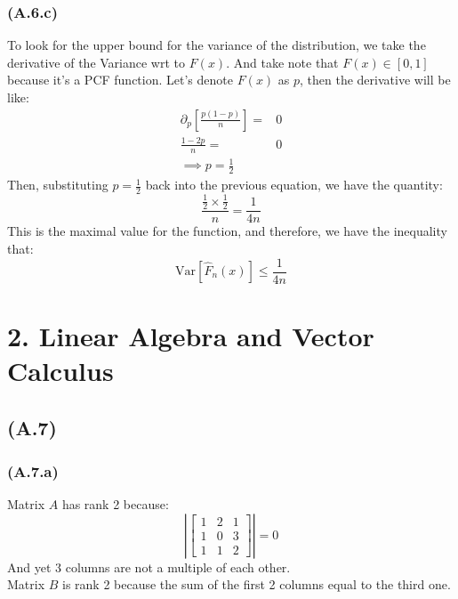 \documentclass[]{article}
\begin{document}
        \subsubsection*{(A.6.c)}
            To look for the upper bound for the variance of the distribution, we take the derivative of the Variance wrt to $F(x)$. And take note that $F(x)\in[0,1]$ because it's a PCF function. Let's denote $F(x)$ as $p$, then the derivative will be like: 
            \begin{align*}\tag{1.6.c.1}\label{eqn:1.6.c.1}
                \partial_p \left[
                    \frac{p(1 - p)}{n}
                \right]
                =& 0
                \\
                \frac{1 - 2p}{n} =& 0
                \\
                \implies p = \frac{1}{2}
            \end{align*}        
            Then, substituting $p=\frac{1}{2}$ back into the previous equation, we have the quantity: 
            \begin{equation*}\tag{1.6.c.2}\label{eqn:1.6.c.2}
                \frac{\frac{1}{2}\times \frac{1}{2}}{n} = \frac{1}{4n}
            \end{equation*}
            This is the maximal value for the function, and therefore, we have the inequality that: 
            $$
                \text{Var}\left[\hat{F}_n(x)\right]
                \le
                \frac{1}{4n}
            $$
\section*{2. Linear Algebra and Vector Calculus}
    \subsection*{(A.7)}
        \subsubsection*{(A.7.a)}
            Matrix $A$ has rank 2 because: 
            \begin{equation*}\tag{2.7.a.1}\label{eqn:2.7.a.1}
                \left\vert
                     \begin{bmatrix}
                        1 & 2 & 1 \\
                        1 & 0 & 3 \\
                        1 & 1 & 2
                     \end{bmatrix}
                \right\vert
                =
                0
            \end{equation*}
            And yet 3 columns are not a multiple of each other. 
            \\
            Matrix $B$ is rank 2 because the sum of the first 2 columns equal to the third one. 
\end{document}

